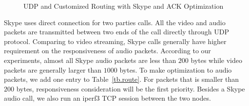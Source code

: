\begin{figure}[htp]
\caption{UDP and Customized Routing with Skype and ACK Optimization}
\label{fig.skype}
\end{figure}

Skype uses direct connection for two parties calls. All the video and audio packets are transmitted between two ends of the call directly through UDP protocol. Comparing to video streaming, Skype calls generally have higher requirement on the responsiveness of audio packets. According to our experiments, almost all Skype audio packets are less than $200$ bytes while video packets are generally larger than $1000$ bytes. To make optimization to audio packets, we add one entry to Table~\ref{tb.route}. For packets that is smaller than $200$ bytes, responsiveness consideration will be the first priority. Besides a Skype audio call, we also run an iperf3 TCP session between the two nodes.

